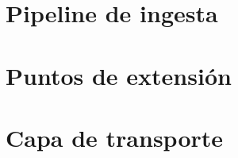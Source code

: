 \documentclass[11pt,openany]{book}
\begin{document}
\part{Pipeline de ingesta}






\part{Puntos de extensión}






\part{Capa de transporte}






\appendix




\end{document}
